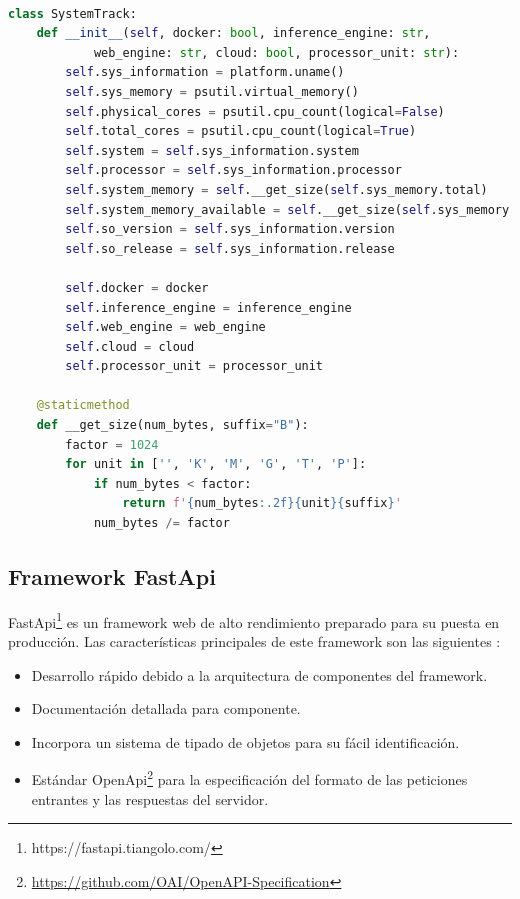 \begin{lstlisting}[caption=Clase Python para generar información sobre el sistema,
      label=d_label,
      language=Python,label={example4}]

class SystemTrack:
    def __init__(self, docker: bool, inference_engine: str, 
            web_engine: str, cloud: bool, processor_unit: str):
        self.sys_information = platform.uname()
        self.sys_memory = psutil.virtual_memory()
        self.physical_cores = psutil.cpu_count(logical=False)
        self.total_cores = psutil.cpu_count(logical=True)
        self.system = self.sys_information.system
        self.processor = self.sys_information.processor
        self.system_memory = self.__get_size(self.sys_memory.total)
        self.system_memory_available = self.__get_size(self.sys_memory.available)
        self.so_version = self.sys_information.version
        self.so_release = self.sys_information.release

        self.docker = docker
        self.inference_engine = inference_engine
        self.web_engine = web_engine
        self.cloud = cloud
        self.processor_unit = processor_unit

    @staticmethod
    def __get_size(num_bytes, suffix="B"):
        factor = 1024
        for unit in ['', 'K', 'M', 'G', 'T', 'P']:
            if num_bytes < factor:
                return f'{num_bytes:.2f}{unit}{suffix}'
            num_bytes /= factor
\end{lstlisting}
\subsection{Framework FastApi}\label{subsec:framework-fastapi}
FastApi\footnote{https://fastapi.tiangolo.com/} es un framework web de alto rendimiento preparado para su puesta en producción.
Las características principales de este framework son las siguientes :

\begin{itemize}
    \item Desarrollo rápido debido a la arquitectura de componentes del framework.
    \item Documentación detallada para componente.
    \item Incorpora un sistema de tipado de objetos para su fácil identificación.
    \item Estándar OpenApi\footnote{\url{https://github.com/OAI/OpenAPI-Specification}} para la especificación del formato de las peticiones entrantes y las respuestas del servidor.
\end{itemize}

